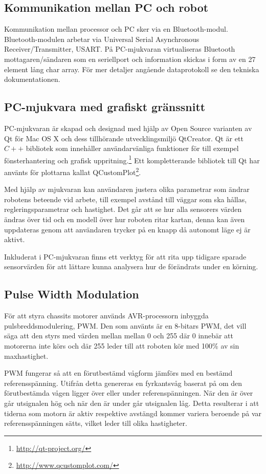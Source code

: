 ﻿\documentclass[a4paper,12pt,fleqn]{article}
\begin{document}
\subsection{Kommunikation mellan PC och robot}
Kommunikation mellan processor och PC sker via en Bluetooth-modul. Bluetooth-modulen arbetar via Universal Serial Asynchronous Receiver/Transmitter, USART.
På PC-mjukvaran virtualiseras Bluetooth mottagaren/sändaren som en seriellport och information skickas i form av en 27 element lång char array. För mer detaljer angående dataprotokoll se den tekniska dokumentationen. 

\subsection{PC-mjukvara med grafiskt gränssnitt}

PC-mjukvaran är skapad och designad med hjälp av Open Source varianten av Qt för Mac OS X och dess tillhörande utvecklingsmiljö QtCreator. Qt är ett $C++$ bibliotek som innehåller användarvänliga funktioner för till exempel fönsterhantering och grafisk uppritning.\footnote{\url{http://qt-project.org/}} Ett kompletterande bibliotek till Qt har använts för plottarna kallat QCustomPlot\footnote{\url{http://www.qcustomplot.com/}}.

Med hjälp av mjukvaran kan användaren justera olika parametrar som ändrar robotens beteende vid arbete, till exempel avstånd till väggar som ska hållas, regleringsparametrar och hastighet. Det går att se hur alla sensorers värden ändras över tid och en modell över hur roboten ritar kartan, denna kan även uppdateras genom att användaren trycker på en knapp då autonomt läge ej är aktivt.

Inkluderat i PC-mjukvaran finns ett verktyg för att rita upp tidigare sparade sensorvärden för att lättare kunna analysera hur de förändrats under en körning.

\subsection{Pulse Width Modulation}

För att styra chassits motorer används AVR-processorn inbyggda pulsbreddsmodulering, PWM. Den som använts är en 8-bitars PWM, det vill säga att den styrs med värden mellan mellan 0 och 255 där 0 innebär att motorerna inte körs och där 255 leder till att roboten kör med 100\% av sin maxhastighet.

PWM fungerar så att en förutbestämd vågform jämförs med en bestämd referensspänning. Utifrån detta genereras en fyrkantsvåg baserat på om den förutbestämda vågen ligger över eller under referenspänningen. När den är över går utsignalen hög och när den är under går utsignalen låg. Detta resulterar i att tiderna som motorn är aktiv respektive avstängd kommer variera beroende på var referensspänningen sätts, vilket leder till olika hastigheter.
\end{document}
